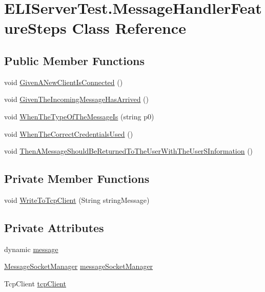 \hypertarget{class_e_l_i_server_test_1_1_message_handler_feature_steps}{}\section{E\+L\+I\+Server\+Test.\+Message\+Handler\+Feature\+Steps Class Reference}
\label{class_e_l_i_server_test_1_1_message_handler_feature_steps}
\subsection*{Public Member Functions}
\begin{DoxyCompactItemize}
\item 
void \hyperlink{class_e_l_i_server_test_1_1_message_handler_feature_steps_a3e5317dc49ff97152fdc5f2ccb14203a}{Given\+A\+New\+Client\+Is\+Connected} ()
\item 
void \hyperlink{class_e_l_i_server_test_1_1_message_handler_feature_steps_ab02fabcd79b24b7ad49e47190ed91523}{Given\+The\+Incoming\+Message\+Has\+Arrived} ()
\item 
void \hyperlink{class_e_l_i_server_test_1_1_message_handler_feature_steps_ad1c24fc5715c296d99bc93b3f38b4e82}{When\+The\+Type\+Of\+The\+Message\+Is} (string p0)
\item 
void \hyperlink{class_e_l_i_server_test_1_1_message_handler_feature_steps_a70d71be413eeea4271bcff20e1c8df10}{When\+The\+Correct\+Credentials\+Used} ()
\item 
void \hyperlink{class_e_l_i_server_test_1_1_message_handler_feature_steps_a94a26dcc7152a319844eb3dc78e28a02}{Then\+A\+Message\+Should\+Be\+Returned\+To\+The\+User\+With\+The\+User\+S\+Information} ()
\end{DoxyCompactItemize}
\subsection*{Private Member Functions}
\begin{DoxyCompactItemize}
\item 
void \hyperlink{class_e_l_i_server_test_1_1_message_handler_feature_steps_abad9f97e024dcd089ebf349c73dd3f81}{Write\+To\+Tcp\+Client} (String string\+Message)
\end{DoxyCompactItemize}
\subsection*{Private Attributes}
\begin{DoxyCompactItemize}
\item 
dynamic \hyperlink{class_e_l_i_server_test_1_1_message_handler_feature_steps_a004b650b445cf21a2014c3eccb1178b0}{message}
\item 
\hyperlink{class_e_l_i_server_1_1_message_socket_manager}{Message\+Socket\+Manager} \hyperlink{class_e_l_i_server_test_1_1_message_handler_feature_steps_a90fbf23167b6c908c4c76d600d6d4f3c}{message\+Socket\+Manager}
\item 
Tcp\+Client \hyperlink{class_e_l_i_server_test_1_1_message_handler_feature_steps_a4adfd8f14ed34eeddca5d0500f414820}{tcp\+Client}
\end{DoxyCompactItemize}


